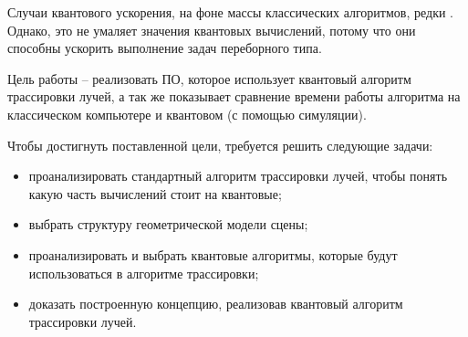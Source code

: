 Случаи квантового ускорения, на фоне массы классических алгоритмов, редки \cite{quantum-computers-speed-up}. Однако, это не умаляет значения квантовых вычислений, потому что они способны ускорить выполнение задач переборного типа. 

Цель работы -- реализовать ПО, которое
использует квантовый алгоритм трассировки лучей, а так же показывает сравнение времени работы алгоритма на классическом
компьютере и квантовом (с помощью симуляции).

Чтобы достигнуть поставленной цели, требуется решить следующие задачи:

\begin{itemize}
    \item проанализировать стандартный алгоритм трассировки лучей, чтобы
понять какую часть вычислений стоит на квантовые;
    \item выбрать структуру геометрической модели сцены;
    \item проанализировать и выбрать квантовые алгоритмы, которые будут использоваться в алгоритме трассировки;
    \item доказать построенную концепцию, реализовав квантовый алгоритм трассировки лучей.
\end{itemize}
